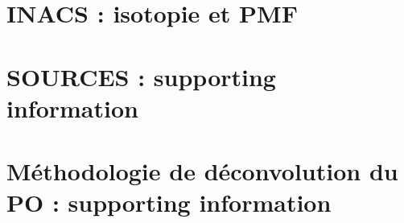 \documentclass[a4paper,12pt]{book}
\begin{document}

\appendix
\setcounter{table}{0}
\setcounter{figure}{0}
\setcounter{equation}{0}
\renewcommand{\thetable}{\thesection-\arabic{table}}
\renewcommand{\thefigure}{\thesection-\arabic{figure}}
\renewcommand{\theequation}{\thesection-\arabic{equation}}

\section{INACS : isotopie et PMF}%
\label{annexe:INACS}
% 

\section{SOURCES : supporting information}
\label{annexe:SOURCES_SI}
% 

\section{Méthodologie de déconvolution du PO : supporting information}
\label{annexe:deconvol_OP_SI}
% 

\end{document}
